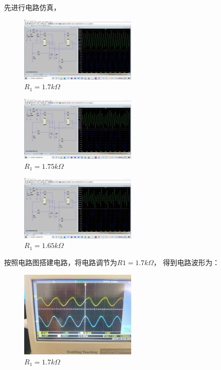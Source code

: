 \documentclass[UTF8]{ctexart}
\begin{document}
先进行电路仿真，
\begin{figure}[H]
        \centering
        \includegraphics*[width = 0.5\textwidth]{1-1-1.7k.jpg}
        \caption{$R_1 = 1.7k\Omega$}
\end{figure}
\begin{figure}[H]
        \centering
        \includegraphics*[width = 0.5\textwidth]{1-1-1.75k.jpg}
        \caption{$R_1 = 1.75k\Omega$}
\end{figure}
\begin{figure}[H]
        \centering
        \includegraphics*[width = 0.5\textwidth]{1-1-1.65k.jpg}
        \caption{$R_1 = 1.65k\Omega$}
\end{figure}

按照电路图搭建电路，将电路调节为$R1=1.7k \Omega$，
得到电路波形为：

\begin{figure}[H]
        \centering
        \includegraphics*[width = 0.5\textwidth]{1-1-1.7k-r.jpg}
        \caption{$R_1 = 1.7k \Omega$}
\end{figure}
\end{document}
